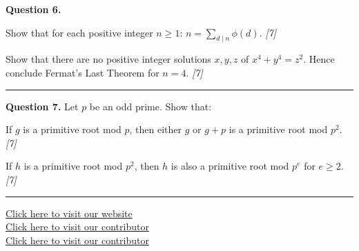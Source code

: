 \documentclass[11pt,a4paper]{article}
\newcommand{\pts}[1]{\hfill   \textit{[#1]}}
\begin{document}
\noindent   \textbf{Question 6.}

\begin{parts}
  \item Show that for each positive integer $n \ge 1$: $n = \displaystyle\sum_{d \mid n} \phi(d)$. \pts{7}
  \item Show that there are no positive integer solutions $x, y, z$ of $x^4 + y^4 = z^2$. Hence conclude Fermat's Last Theorem for $n = 4$. \pts{7}
\end{parts}

\medskip\rule{\linewidth}{0.2pt}

\medskip


\noindent   \textbf{Question 7.}
Let $p$ be an odd prime. Show that:

\begin{parts}
  \item If $g$ is a primitive root mod $p$, then either $g$ or $g + p$ is a primitive root mod $p^2$. \pts{7}
  \item If $h$ is a primitive root mod $p^2$, then $h$ is also a primitive root mod $p^e$ for $e \ge 2$. \pts{7}
\end{parts}

\vfill\rule{\linewidth}{0.4pt}

\begin{center}\small
  \href{https://bhu-exam.vercel.app/}{Click here to visit our website}\\[4pt]
  \href{https://me-aryan.vercel.app/}{Click here to visit our contributor}\\[4pt]
  \href{https://quashan-me.vercel.app/}{Click here to visit our contributor}
\end{center}
\end{document}

